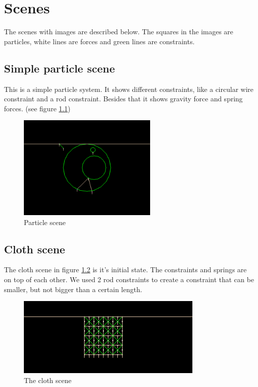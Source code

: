 \chapter{Scenes}
The scenes with images are described below. The squares in the images are particles, white lines are forces and green lines are constraints.

\section{Simple particle scene}
This is a simple particle system. It shows different constraints, like a circular wire constraint and a rod constraint. Besides that it shows gravity force and spring forces. (see figure \ref{fig:Particle})
\begin{figure}[htb!]
    \centering
    \includegraphics[width=0.6\textwidth]{images/Particle}
    \caption{Particle scene}
    \label{fig:Particle}
\end{figure}

\section{Cloth scene}

The cloth scene in figure \ref{fig:Cloth} is it's initial state. The constraints and springs are on top of each other. We used 2 rod constraints to create a constraint that can be smaller, but not bigger than a certain length.

\begin{figure}[htb!]
    \centering
    \includegraphics[width=0.8\textwidth]{images/Cloth}
    \caption{The cloth scene}
    \label{fig:Cloth}
\end{figure}


